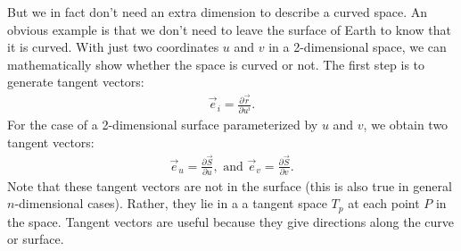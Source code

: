 \documentclass{article}
\theoremstyle{definition}
\begin{document}
But we in fact don't need an extra dimension to describe a curved space. An obvious example is that we don't need to leave the surface of Earth to know that it is curved. With just two coordinates $u$ and $v$ in a 2-dimensional space, we can mathematically show whether the space is curved or not. The first step is to generate tangent vectors:
\begin{align*}
\vec{e}_i = \frac{\partial \vec{r}}{\partial u^i}.
\end{align*} 
For the case of a 2-dimensional surface parameterized by $u$ and $v$, we obtain two tangent vectors:
\begin{align*}
\vec{e}_u = \frac{\partial \vec{S}}{\partial u}, \text{ and } \vec{e}_v = \frac{\partial \vec{S}}{\partial v}.
\end{align*}
Note that these tangent vectors are not in the surface (this is also true in general $n$-dimensional cases). Rather, they lie in a a tangent space $T_p$ at each point $P$ in the space. Tangent vectors are useful because they give directions along the curve or surface.\\
\end{document}
